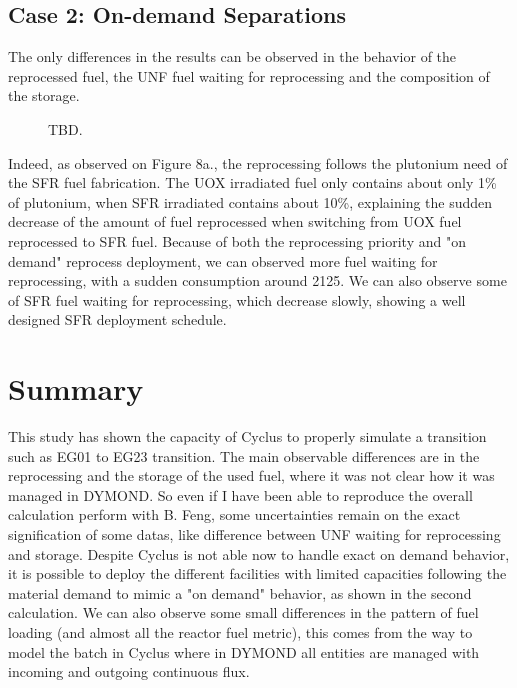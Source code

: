 \documentclass[12pt]{article}
\begin{document}
\subsection{Case 2: On-demand Separations}

The only differences in the results can be observed in the behavior of the
reprocessed fuel, the UNF fuel waiting for reprocessing and the composition of
the storage.

\begin{figure}[h!]
    \centering
    \caption{TBD.\label{fig:ARR_FWR_SFC_2} }
\end{figure}

Indeed, as observed on Figure 8a., the reprocessing follows the plutonium need
of the SFR fuel fabrication. The UOX irradiated fuel only contains about only
1\% of plutonium, when SFR irradiated contains about 10\%, explaining the
sudden decrease of the  amount of fuel reprocessed when switching from UOX
fuel reprocessed to SFR fuel.  Because of both the reprocessing priority and
"on demand" reprocess deployment, we can observed more fuel waiting for
reprocessing, with a sudden consumption around 2125. We can also observe some
of SFR fuel waiting for reprocessing, which decrease slowly, showing a well
designed SFR deployment schedule.

\section{Summary}

This study has shown the capacity of Cyclus to properly simulate a transition
such as EG01 to EG23 transition.  The main observable differences are in the
reprocessing and the storage of the used fuel, where it was not clear how it
was managed in DYMOND. So even if I have been able to reproduce the overall
calculation perform with B. Feng, some uncertainties remain on the exact
signification of some datas, like difference between UNF waiting for
reprocessing and storage.  Despite Cyclus is not able now to handle exact on
demand behavior, it is possible to deploy the different facilities with
limited capacities following the material demand to mimic a "on demand"
behavior, as shown in the second calculation.  We can also observe some small
differences in the pattern of fuel loading (and almost all the reactor fuel
metric), this comes from the way to model the batch in Cyclus where in DYMOND
all entities are managed with incoming and outgoing continuous flux.






\end{document}

